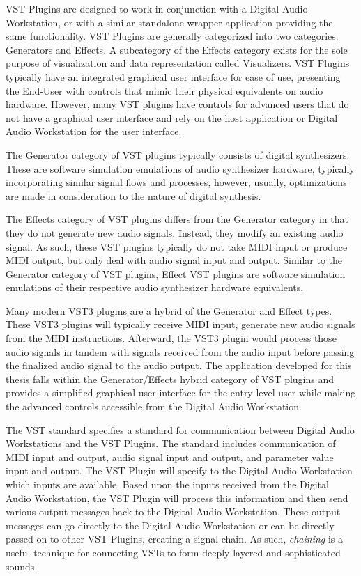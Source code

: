 \documentclass[a4paper,12pt]{report}
\begin{document}
VST Plugins are designed to work in conjunction with a Digital Audio Workstation, or with a similar standalone wrapper application providing the same functionality. VST Plugins are generally categorized into two categories: Generators and Effects. A subcategory of the Effects category exists for the sole purpose of visualization and data representation called Visualizers. VST Plugins typically have an integrated graphical user interface for ease of use, presenting the End-User with controls that mimic their physical equivalents on audio hardware. However, many VST plugins have controls for advanced users that do not have a graphical user interface and rely on the host application or Digital Audio Workstation for the user interface.

The Generator category of VST plugins typically consists of digital synthesizers. These are software simulation emulations of audio synthesizer hardware, typically incorporating similar signal flows and processes, however, usually, optimizations are made in consideration to the nature of digital synthesis. 

The Effects category of VST plugins differs from the Generator category in that they do not generate new audio signals. Instead, they modify an existing audio signal. As such, these VST plugins typically do not take MIDI input or produce MIDI output, but only deal with audio signal input and output. Similar to the Generator category of VST plugins, Effect VST plugins are software simulation emulations of their respective audio synthesizer hardware equivalents.

Many modern VST3 plugins are a hybrid of the Generator and Effect types. These VST3 plugins will typically receive MIDI input, generate new audio signals from the MIDI instructions. Afterward, the VST3 plugin would process those audio signals in tandem with signals received from the audio input before passing the finalized audio signal to the audio output. The application developed for this thesis falls within the Generator/Effects hybrid category of VST plugins and provides a simplified graphical user interface for the entry-level user while making the advanced controls accessible from the Digital Audio Workstation.

The VST standard specifies a standard for communication between Digital Audio Workstations and the VST Plugins. The standard includes communication of MIDI input and output, audio signal input and output, and parameter value input and output. The VST Plugin will specify to the Digital Audio Workstation which inputs are available. Based upon the inputs received from the Digital Audio Workstation, the VST Plugin will process this information and then send various output messages back to the Digital Audio Workstation. These output messages can go directly to the Digital Audio Workstation or can be directly passed on to other VST Plugins, creating a signal chain. As such, \emph{chaining} is a useful technique for connecting VSTs to form deeply layered and sophisticated sounds.
\end{document}
